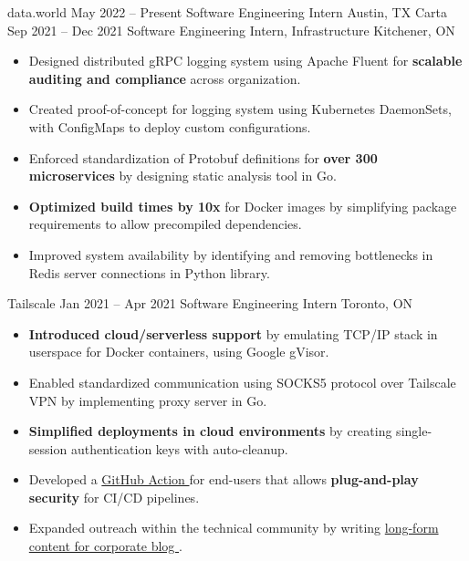 \documentclass{article}
\begin{document}
\normalsize
\WorkEntry
{data.world}
{May 2022 -- Present}
{Software Engineering Intern \hfill Austin, TX}
{\vspace{0.1mm}}
\WorkEntry
{Carta}
{Sep 2021 -- Dec 2021}
{Software Engineering Intern, Infrastructure \hfill Kitchener, ON}
{
\begin{itemize} \itemsep -1pt
    \item Designed distributed gRPC logging system using Apache Fluent for \textbf{scalable auditing and compliance} across organization.
    \item Created proof-of-concept for logging system using Kubernetes DaemonSets, with ConfigMaps to deploy custom configurations.
    \item Enforced standardization of Protobuf definitions for \textbf{over 300 microservices} by designing static analysis tool in Go.
    \item \textbf{Optimized build times by 10x} for Docker images by simplifying package requirements to allow precompiled dependencies.
    \item Improved system availability by identifying and removing bottlenecks in Redis server connections in Python library.
\end{itemize}}
\iffalse
Made Tailscale ready for the cloud, by creating features that allowed it to run in lightweight, unprivileged container environments. This included a virtual networking stack for connecting to the Tailscale network without kernel privileges to create a network driver, a SOCKS5 proxy to allow applications to communicate over this virtual networking stack, and ephemeral authentication keys for stateless access to the Tailscale network. Also published long-form technical content on company blog (https://tailscale.com/blog/2021-05-github-actions-and-tailscale/) and contributed to product knowledge base.
\fi
\WorkEntry
{Tailscale}
{Jan 2021 -- Apr 2021}
{Software Engineering Intern \hfill Toronto, ON}
{\begin{itemize} \itemsep -1pt
    \item \textbf{Introduced cloud/serverless support} by emulating TCP/IP stack in userspace for Docker containers, using Google gVisor.
    \item Enabled standardized communication using SOCKS5 protocol over Tailscale VPN by implementing proxy server in Go.
    \item \textbf{Simplified deployments in cloud environments} by creating single-session authentication keys with auto-cleanup.
    \item Developed a \href{https://github.com/tailscale/github-action}{GitHub Action \linkIcon} for end-users that allows \textbf{plug-and-play security} for CI/CD pipelines.
    \item Expanded outreach within the technical community by writing \href{https://tailscale.com/blog/2021-05-github-actions-and-tailscale/}{long-form content for corporate blog \linkIcon}.
    \end{itemize}}
\end{document}
